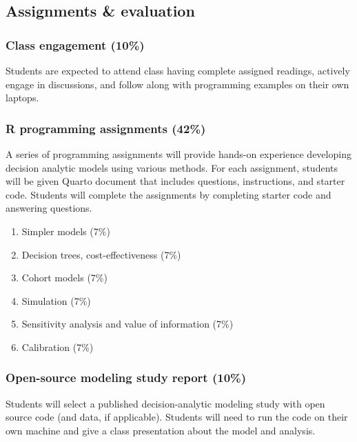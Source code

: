 \documentclass[
  letterpaper,
  DIV=11,
  numbers=noendperiod]{scrartcl}
\providecommand{\tightlist}{%
  \setlength{\itemsep}{0pt}\setlength{\parskip}{0pt}}\usepackage{longtable,booktabs,array}
\begin{document}
\hypertarget{assignments-evaluation}{%
\subsection{Assignments \& evaluation}\label{assignments-evaluation}}

\hypertarget{class-engagement-10}{%
\subsubsection{Class engagement (10\%)}\label{class-engagement-10}}

Students are expected to attend class having complete assigned readings,
actively engage in discussions, and follow along with programming
examples on their own laptops.

\hypertarget{r-programming-assignments-42}{%
\subsubsection{R programming assignments
(42\%)}\label{r-programming-assignments-42}}

A series of programming assignments will provide hands-on experience
developing decision analytic models using various methods. For each
assignment, students will be given Quarto document that includes
questions, instructions, and starter code. Students will complete the
assignments by completing starter code and answering questions.

\begin{enumerate}
\def\labelenumi{\arabic{enumi}.}
\setcounter{enumi}{-1}
\tightlist
\item
  Simpler models (7\%)
\item
  Decision trees, cost-effectiveness (7\%)
\item
  Cohort models (7\%)
\item
  Simulation (7\%)
\item
  Sensitivity analysis and value of information (7\%)
\item
  Calibration (7\%)
\end{enumerate}

\hypertarget{open-source-modeling-study-report-10}{%
\subsubsection{Open-source modeling study report
(10\%)}\label{open-source-modeling-study-report-10}}

Students will select a published decision-analytic modeling study with
open source code (and data, if applicable). Students will need to run
the code on their own machine and give a class presentation about the
model and analysis.
\end{document}

